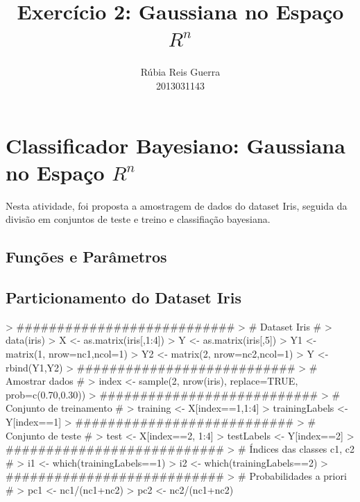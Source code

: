 \documentclass{article}
\title{Exercício 2: Gaussiana no Espaço $R^n$}
\author{Rúbia Reis Guerra \\ 2013031143}
\begin{document}

\maketitle

\section{Classificador Bayesiano: Gaussiana no Espaço $R^n$}
Nesta atividade, foi proposta a amostragem de dados do dataset Iris, seguida da divisão em conjuntos de teste e treino e classifiação bayesiana.

\subsection{Funções e Parâmetros}
\begin{Schunk}
\end{Schunk}

\subsection{Particionamento do Dataset Iris}
\begin{Schunk}
\begin{Sinput}
> ###########################
> # Dataset Iris #
> data(iris)
> X <- as.matrix(iris[,1:4])
> Y <- as.matrix(iris[,5])
> Y1 <- matrix(1, nrow=nc1,ncol=1)
> Y2 <- matrix(2, nrow=nc2,ncol=1)
> Y <- rbind(Y1,Y2)
> ###########################
> # Amostrar dados #
> index <- sample(2, nrow(iris), replace=TRUE, prob=c(0.70,0.30))
> ###########################
> # Conjunto de treinamento #
> training <- X[index==1,1:4]
> trainingLabels <- Y[index==1]
> ###########################
> # Conjunto de teste #
> test <- X[index==2, 1:4]
> testLabels <- Y[index==2]
> ###########################
> # Índices das classes c1, c2 #
> i1 <- which(trainingLabels==1)
> i2 <- which(trainingLabels==2)
> ###########################
> # Probabilidades a priori #
> pc1 <- nc1/(nc1+nc2)
> pc2 <- nc2/(nc1+nc2)
\end{Sinput}
\end{Schunk}
\end{document}
